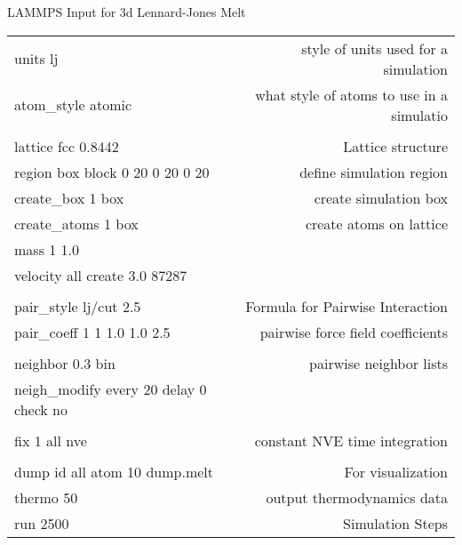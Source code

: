 \documentclass[slidestop,mathserif,compress,xcolor=svgnames]{beamer}
\begin{document}
\begin{frame}
  \frametitle{}
  {\scriptsize
  \vspace{-0.3cm}
  \begin{exampleblock}{LAMMPS Input for 3d Lennard-Jones Melt}
    \begin{tabular}{lr}
    units   lj & {\color{red}style of units used for a simulation}\\
    atom\_style  atomic & {\color{red}what style of atoms to use in a simulatio}\\
     & \\
    lattice   fcc 0.8442 & {\color{red}Lattice structure}\\
    region    box block 0 20 0 20 0 20 & {\color{red}define simulation region}\\
    create\_box  1 box & {\color{red}create simulation box}\\
    create\_atoms  1 box & {\color{red}create atoms on lattice}\\
    mass    1 1.0 & {\color{red}}\\
    velocity  all create 3.0 87287 & {\color{red}}\\
     & \\
    pair\_style  lj/cut 2.5 & {\color{red}Formula for Pairwise Interaction}\\
    pair\_coeff  1 1 1.0 1.0 2.5 & {\color{red}pairwise force field coefficients}\\
     & \\
    neighbor  0.3 bin & {\color{red}pairwise neighbor lists}\\
    neigh\_modify  every 20 delay 0 check no & {\color{red}}\\
     & \\
    fix   1 all nve & {\color{red}constant NVE time integration}\\
     & \\
    dump    id all atom 10 dump.melt & {\color{red}For visualization}\\
    thermo    50 & {\color{red}output thermodynamics data}\\
    run   2500 & {\color{red}Simulation Steps}\\
    \end{tabular}
  \end{exampleblock}
  }
\end{frame}
\end{document}
